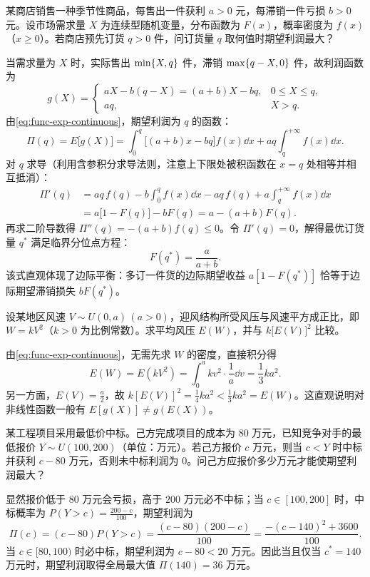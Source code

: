 \begin{example}[title={随机需求下的最优订货量（报童模型）}]
\label{eg:production-expectation}
某商店销售一种季节性商品，每售出一件获利 $a>0$ 元，每滞销一件亏损 $b>0$ 元。设市场需求量 $X$ 为连续型随机变量，分布函数为 $F(x)$，概率密度为 $f(x)$（$x\ge 0$）。若商店预先订货 $q>0$ 件，问订货量 $q$ 取何值时期望利润最大？
\begin{solution}
当需求量为 $X$ 时，实际售出 $\min\{X,q\}$ 件，滞销 $\max\{q-X,0\}$ 件，故利润函数为
\[
  g(X)=
  \begin{cases}
    aX-b(q-X)=(a+b)X-bq,& 0\le X\le q,\\
    aq,& X>q.
  \end{cases}
\]
由\eqref{eq:func-exp-continuous}，期望利润为 $q$ 的函数：
\[
  \Pi(q)=E\bigl[g(X)\bigr]
  =\int_{0}^{q}\bigl[(a+b)x-bq\bigr]f(x)\dd x+aq\int_{q}^{+\infty}f(x)\dd x.
\]
对 $q$ 求导（利用含参积分求导法则，注意上下限处被积函数在 $x=q$ 处相等并相互抵消）：
\[
\begin{aligned}
  \Pi'(q)&=aq\,f(q)-b\int_{0}^{q}f(x)\dd x-aq\,f(q)+a\int_{q}^{+\infty}f(x)\dd x\\
  &=a\bigl[1-F(q)\bigr]-bF(q)=a-(a+b)F(q).
\end{aligned}
\]
再求二阶导数得 $\Pi''(q)=-(a+b)f(q)\le 0$。令 $\Pi'(q)=0$，解得最优订货量 $q^*$ 满足临界分位点方程：
\[
  F(q^*)=\frac{a}{a+b}.
\]
该式直观体现了边际平衡：多订一件货的边际期望收益 $a[1-F(q^*)]$ 恰等于边际期望滞销损失 $bF(q^*)$。
\end{solution}
\end{example}

\begin{example}[title={风速平方对应的平均风压}]
\label{eg:wind-pressure}
设某地区风速 $V\sim U(0,a)\,(a>0)$，迎风结构所受风压与风速平方成正比，即 $W=kV^2$（$k>0$ 为比例常数）。求平均风压 $E(W)$，并与 $k\bigl[E(V)\bigr]^2$ 比较。
\begin{solution}
由\eqref{eq:func-exp-continuous}，无需先求 $W$ 的密度，直接积分得
\[
  E(W)=E(kV^2)=\int_{0}^{a}kv^2\cdot\frac{1}{a}\dd v=\frac{1}{3}ka^2.
\]
另一方面，$E(V)=\frac{a}{2}$，故 $k[E(V)]^2=\frac{1}{4}ka^2<\frac{1}{3}ka^2=E(W)$。这直观说明对非线性函数一般有 $E[g(X)]\ne g(E(X))$。
\end{solution}
\end{example}

\begin{example}[title={密封投标的最优报价决策}]
\label{eg:auction-expectation}
某工程项目采用最低价中标。己方完成项目的成本为 $80$ 万元，已知竞争对手的最低报价 $Y\sim U(100,200)$（单位：万元）。若己方报价 $c$ 万元，则当 $c<Y$ 时中标并获利 $c-80$ 万元，否则未中标利润为 $0$。问己方应报价多少万元才能使期望利润最大？
\begin{solution}
显然报价低于 $80$ 万元会亏损，高于 $200$ 万元必不中标；当 $c\in[100,200]$ 时，中标概率为 $P(Y>c)=\frac{200-c}{100}$，期望利润为
\[
  \Pi(c)=(c-80)P(Y>c)=\frac{(c-80)(200-c)}{100}
  =\frac{-(c-140)^2+3600}{100}.
\]
当 $c\in[80,100)$ 时必中标，期望利润为 $c-80<20$ 万元。因此当且仅当 $c^*=140$ 万元时，期望利润取得全局最大值 $\Pi(140)=36$ 万元。
\end{solution}
\end{example}

